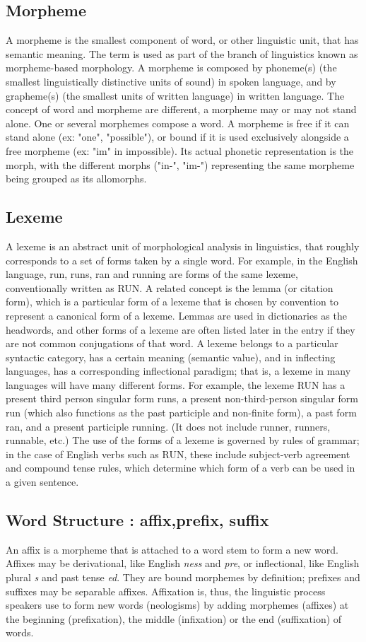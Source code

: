 \subsection{Morpheme}
A morpheme is the smallest component of word, or other linguistic unit, that has semantic meaning. The term is used as part of the branch of linguistics known as morpheme-based morphology. A morpheme is composed by phoneme(s) (the smallest linguistically distinctive units of sound) in spoken language, and by grapheme(s) (the smallest units of written language) in written language.  The concept of word and morpheme are different, a morpheme may or may not stand alone. One or several morphemes compose a word. A morpheme is free if it can stand alone (ex: "one", "possible"), or bound if it is used exclusively alongside a free morpheme (ex: "im" in impossible). Its actual phonetic representation is the morph, with the different morphs ("in-", "im-") representing the same morpheme being grouped as its allomorphs.
\subsection{Lexeme}
A lexeme  is an abstract unit of morphological analysis in linguistics, that roughly corresponds to a set of forms taken by a single word. For example, in the English language, run, runs, ran and running are forms of the same lexeme, conventionally written as RUN. A related concept is the lemma (or citation form), which is a particular form of a lexeme that is chosen by convention to represent a canonical form of a lexeme. Lemmas are used in dictionaries as the headwords, and other forms of a lexeme are often listed later in the entry if they are not common conjugations of that word.
A lexeme belongs to a particular syntactic category, has a certain meaning (semantic value), and in inflecting languages, has a corresponding inflectional paradigm; that is, a lexeme in many languages will have many different forms. For example, the lexeme RUN has a present third person singular form runs, a present non-third-person singular form run (which also functions as the past participle and non-finite form), a past form ran, and a present participle running. (It does not include runner, runners, runnable, etc.) The use of the forms of a lexeme is governed by rules of grammar; in the case of English verbs such as RUN, these include subject-verb agreement and compound tense rules, which determine which form of a verb can be used in a given sentence.

\subsection{Word Structure : affix,prefix, suffix}
An affix is a morpheme that is attached to a word stem to form a new word. Affixes may be derivational, like English \emph{ness} and \emph{pre}, or inflectional, like English plural \emph{s} and past tense \emph{ed}. They are bound morphemes by definition; prefixes and suffixes may be separable affixes. Affixation is, thus, the linguistic process speakers use to form new words (neologisms) by adding morphemes (affixes) at the beginning (prefixation), the middle (infixation) or the end (suffixation) of words.

